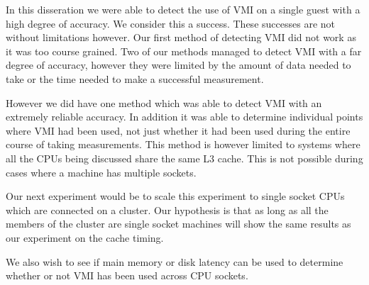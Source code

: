 In this disseration we were able to detect the use of VMI on a single guest with a high degree of accuracy. We consider this a success. These successes are not without limitations however. Our first method of detecting VMI did not work as it was too course grained. Two of our methods managed to detect VMI with a far degree of accuracy, however they were limited by the amount of data needed to take or the time needed to make a successful measurement. 

However we did have one method which was able to detect VMI with an extremely reliable accuracy. In addition it was able to determine individual points where VMI had been used, not just whether it had been used during the entire course of taking measurements. This method is however limited to systems where all the CPUs being discussed share the same L3 cache. This is not possible during cases where a machine has multiple sockets. 

Our next experiment would be to scale this experiment to single socket CPUs which are connected on a cluster. Our hypothesis is that as long as all the members of the cluster are single socket machines will show the same results as our experiment on the cache timing. 

We also wish to see if main memory or disk latency can be used to determine whether or not VMI has been used across CPU sockets. 
\clearpage